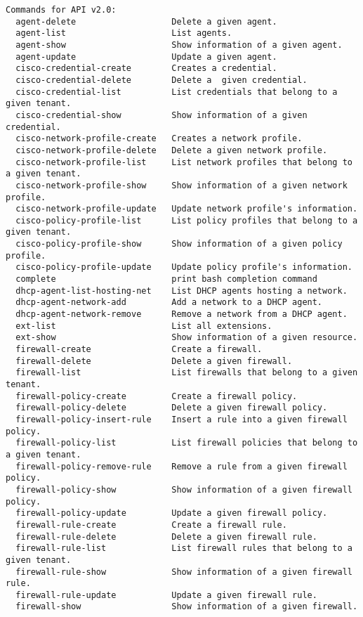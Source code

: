 \documentclass[a4paper,left=1.5cm,right=1.5cm,11pt]{article}
\begin{document}
\begin{lstlisting}
Commands for API v2.0:
  agent-delete                   Delete a given agent.
  agent-list                     List agents.
  agent-show                     Show information of a given agent.
  agent-update                   Update a given agent.
  cisco-credential-create        Creates a credential.
  cisco-credential-delete        Delete a  given credential.
  cisco-credential-list          List credentials that belong to a given tenant.
  cisco-credential-show          Show information of a given credential.
  cisco-network-profile-create   Creates a network profile.
  cisco-network-profile-delete   Delete a given network profile.
  cisco-network-profile-list     List network profiles that belong to a given tenant.
  cisco-network-profile-show     Show information of a given network profile.
  cisco-network-profile-update   Update network profile's information.
  cisco-policy-profile-list      List policy profiles that belong to a given tenant.
  cisco-policy-profile-show      Show information of a given policy profile.
  cisco-policy-profile-update    Update policy profile's information.
  complete                       print bash completion command
  dhcp-agent-list-hosting-net    List DHCP agents hosting a network.
  dhcp-agent-network-add         Add a network to a DHCP agent.
  dhcp-agent-network-remove      Remove a network from a DHCP agent.
  ext-list                       List all extensions.
  ext-show                       Show information of a given resource.
  firewall-create                Create a firewall.
  firewall-delete                Delete a given firewall.
  firewall-list                  List firewalls that belong to a given tenant.
  firewall-policy-create         Create a firewall policy.
  firewall-policy-delete         Delete a given firewall policy.
  firewall-policy-insert-rule    Insert a rule into a given firewall policy.
  firewall-policy-list           List firewall policies that belong to a given tenant.
  firewall-policy-remove-rule    Remove a rule from a given firewall policy.
  firewall-policy-show           Show information of a given firewall policy.
  firewall-policy-update         Update a given firewall policy.
  firewall-rule-create           Create a firewall rule.
  firewall-rule-delete           Delete a given firewall rule.
  firewall-rule-list             List firewall rules that belong to a given tenant.
  firewall-rule-show             Show information of a given firewall rule.
  firewall-rule-update           Update a given firewall rule.
  firewall-show                  Show information of a given firewall.

\end{lstlisting}
\end{document}

